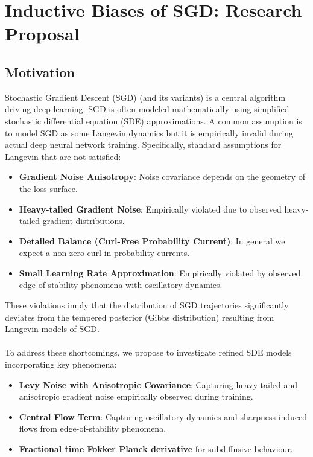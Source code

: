 \documentclass[11pt]{article}
\begin{document}
\section*{Inductive Biases of SGD: Research Proposal}

\subsection*{Motivation}

Stochastic Gradient Descent (SGD) (and its variants) is a central algorithm driving deep learning. SGD is often modeled mathematically using simplified stochastic differential equation (SDE) approximations. A common assumption is to model SGD as some Langevin dynamics but it is empirically invalid during actual deep neural network training. Specifically, standard assumptions for Langevin that are not satisfied:
\begin{itemize}
\item \textbf{Gradient Noise Anisotropy}: Noise covariance depends on the geometry of the loss surface.
\item \textbf{Heavy-tailed Gradient Noise}: Empirically violated due to observed heavy-tailed gradient distributions.
\item \textbf{Detailed Balance (Curl-Free Probability Current)}: In general we expect a non-zero curl in probability currents.
\item \textbf{Small Learning Rate Approximation}: Empirically violated by observed edge-of-stability phenomena with oscillatory dynamics.
\end{itemize}
These violations imply that the distribution of SGD trajectories significantly deviates from the tempered posterior (Gibbs distribution) resulting from Langevin models of SGD. 
\\
\\
To address these shortcomings, we propose to investigate refined SDE models incorporating key phenomena:
\begin{itemize}
\item \textbf{Levy Noise with Anisotropic Covariance}: Capturing heavy-tailed and anisotropic gradient noise empirically observed during training.
\item \textbf{Central Flow Term}: Capturing oscillatory dynamics and sharpness-induced flows from edge-of-stability phenomena.
\item \textbf{Fractional time Fokker Planck derivative} for subdiffusive behaviour.
\end{itemize}
\end{document}
